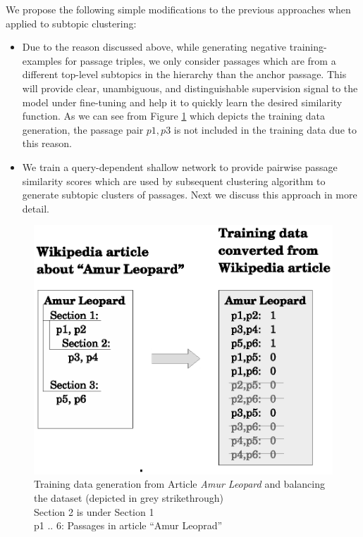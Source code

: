 We propose the following simple modifications to the previous approaches when applied to subtopic clustering:
\begin{itemize}[leftmargin=.15in]
    \item Due to the reason discussed above, while generating negative training-examples for passage triples, we only consider passages which are from a different top-level subtopics in the hierarchy than the anchor passage. This will provide clear, unambiguous, and distinguishable supervision signal to the model under fine-tuning and help it to quickly learn the desired similarity function. As we can see from Figure \ref{fig:conv} which depicts the training data generation, the passage pair $p1,p3$ is not included in the training data due to this reason.
    \item We train a query-dependent shallow network to provide pairwise passage similarity scores which are used by subsequent clustering algorithm to generate subtopic clusters of passages. Next we discuss this approach in more detail.
\end{itemize}{}
\begin{figure}[h]
  \centering
  \includegraphics[width=\linewidth]{graphics/car_y1_conv.eps}
  \caption{Training data generation from Article \textit{Amur Leopard} and balancing the dataset (depicted in grey strikethrough) \\
  Section 2 is under Section 1 \\
  p1 .. 6: Passages in article “Amur Leoprad”}
  \label{fig:conv}
\end{figure}

